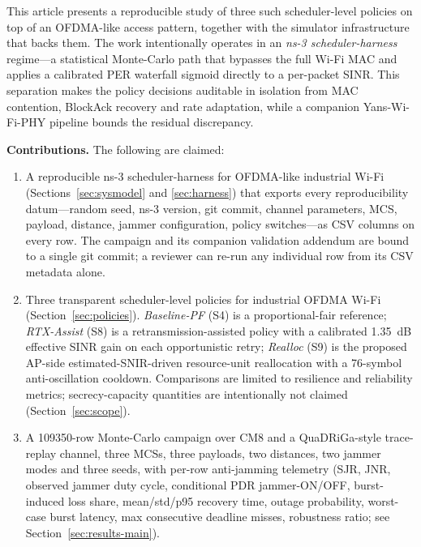\documentclass[journal,onecolumn,11pt,a4paper]{IEEEtran}
\begin{document}
This article presents a reproducible study of three such
scheduler-level policies on top of an OFDMA-like access pattern, together with
the simulator infrastructure that backs them. The work intentionally
operates in an \emph{ns-3 scheduler-harness} regime---a statistical
Monte-Carlo path that bypasses the full Wi-Fi MAC and applies a
calibrated PER waterfall sigmoid \cite{TGax571,Iyy22} directly to a
per-packet SINR. This separation makes the policy decisions auditable
in isolation from MAC contention, BlockAck recovery and rate
adaptation, while a companion Yans-Wi-Fi-PHY \cite{HLR08,LH06} pipeline
bounds the residual discrepancy.

\textbf{Contributions.} The following are claimed:
\begin{enumerate}
  \item A reproducible ns-3 scheduler-harness for OFDMA-like industrial
        Wi-Fi (Sections~\ref{sec:sysmodel} and \ref{sec:harness}) that
        exports every reproducibility datum---random seed,
        ns-3 version, git commit, channel parameters, MCS, payload,
        distance, jammer configuration, policy switches---as CSV columns
        on every row. The campaign and its companion validation
        addendum are bound to a single git commit; a reviewer can
        re-run any individual row from its CSV metadata alone.
  \item Three transparent scheduler-level policies for industrial
        OFDMA Wi-Fi (Section~\ref{sec:policies}). \emph{Baseline-PF}
        (S4) is a proportional-fair reference; \emph{RTX-Assist} (S8)
        is a retransmission-assisted policy with a calibrated
        \SI{1.35}{dB} effective SINR gain on each opportunistic retry;
        \emph{Realloc} (S9) is the proposed AP-side estimated-SNIR-driven
        resource-unit reallocation with a \SI{76}{}-symbol anti-oscillation
        cooldown. Comparisons are limited to resilience and reliability
        metrics; secrecy-capacity quantities are intentionally not
        claimed (Section~\ref{sec:scope}).
  \item A \num{109350}-row Monte-Carlo campaign over CM8 and a
        QuaDRiGa-style trace-replay channel, three MCSs, three
        payloads, two distances, two jammer modes and three seeds, with
        per-row anti-jamming telemetry (SJR, JNR, observed jammer duty
        cycle, conditional PDR jammer-ON/OFF, burst-induced loss share,
        mean/std/p95 recovery time, outage probability, worst-case
        burst latency, max consecutive deadline misses, robustness
        ratio; see Section~\ref{sec:results-main}).

\end{enumerate}
\end{document}
